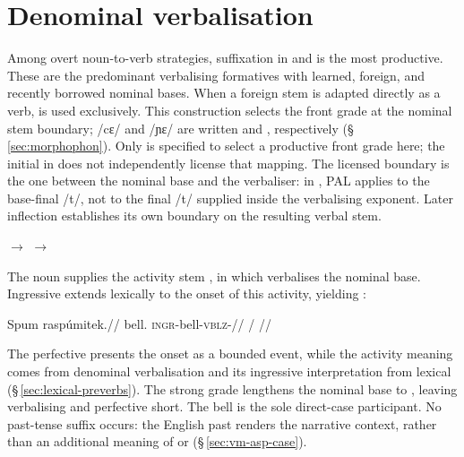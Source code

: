 \section{Denominal verbalisation}\label{sec:denominal-verbalisation}

Among overt noun-to-verb strategies, suffixation in  and
 is the most productive. These are the predominant verbalising
formatives with learned, foreign, and recently borrowed nominal bases.
When a foreign stem is adapted directly as a verb,  is used
exclusively. This construction selects the front grade at the nominal
stem boundary; /cɛ/ and /ɲɛ/ are written  and ,
respectively (§\,\ref{sec:morphophon}). Only  is specified to select a productive front grade here;
the initial  in  does not independently license that mapping. The licensed
boundary is the one between the nominal base and the verbaliser: in
, PAL applies to the base-final /t/, not to the final
/t/ supplied inside the verbalising exponent. Later inflection establishes
its own boundary on the resulting verbal stem.

\pex
\a {} $\rightarrow$  
\a {} $\rightarrow$  
\xe

The noun   supplies the activity stem
 , in which  verbalises the nominal
base. Ingressive  extends lexically to the onset of this activity,
yielding  :

\ex\label{ex:denominal-bell-ingress}%
\begingl
\gla Spum raspúmitek.//
\glb bell.\Dir{} \textsc{ingr}-bell-\textsc{vblz}-\Pf{}//
\glft {} / 
//
\endgl
\xe

The perfective  presents the onset as a bounded event, while the
activity meaning comes from denominal verbalisation and its ingressive
interpretation from lexical 
(§\,\ref{sec:lexical-preverbs}). The strong grade lengthens the nominal
base to , leaving verbalising  and perfective
 short. The bell is the sole direct-case participant. No past-tense
suffix occurs: the English past renders the narrative context, rather than
an additional meaning of  or 
(§\,\ref{sec:vm-asp-case}).

